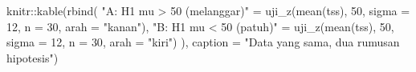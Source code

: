 \documentclass[
  indonesian,
  letterpaper,
]{book}
\newenvironment{Shaded}{\begin{snugshade}}{\end{snugshade}}
\newcommand{\AttributeTok}[1]{\textcolor[rgb]{0.40,0.45,0.13}{#1}}
\newcommand{\DecValTok}[1]{\textcolor[rgb]{0.68,0.00,0.00}{#1}}
\newcommand{\FunctionTok}[1]{\textcolor[rgb]{0.28,0.35,0.67}{#1}}
\newcommand{\NormalTok}[1]{\textcolor[rgb]{0.00,0.23,0.31}{#1}}
\newcommand{\OtherTok}[1]{\textcolor[rgb]{0.00,0.23,0.31}{#1}}
\newcommand{\SpecialCharTok}[1]{\textcolor[rgb]{0.37,0.37,0.37}{#1}}
\newcommand{\StringTok}[1]{\textcolor[rgb]{0.13,0.47,0.30}{#1}}
\begin{document}
\begin{Shaded}
\begin{Highlighting}[]
\NormalTok{knitr}\SpecialCharTok{::}\FunctionTok{kable}\NormalTok{(}\FunctionTok{rbind}\NormalTok{(}
  \StringTok{"A: H1 mu \textgreater{} 50 (melanggar)"} \OtherTok{=} \FunctionTok{uji\_z}\NormalTok{(}\FunctionTok{mean}\NormalTok{(tss), }\DecValTok{50}\NormalTok{, }\AttributeTok{sigma =} \DecValTok{12}\NormalTok{, }\AttributeTok{n =} \DecValTok{30}\NormalTok{,}
                                      \AttributeTok{arah =} \StringTok{"kanan"}\NormalTok{),}
  \StringTok{"B: H1 mu \textless{} 50 (patuh)"}     \OtherTok{=} \FunctionTok{uji\_z}\NormalTok{(}\FunctionTok{mean}\NormalTok{(tss), }\DecValTok{50}\NormalTok{, }\AttributeTok{sigma =} \DecValTok{12}\NormalTok{, }\AttributeTok{n =} \DecValTok{30}\NormalTok{,}
                                      \AttributeTok{arah =} \StringTok{"kiri"}\NormalTok{)}
\NormalTok{), }\AttributeTok{caption =} \StringTok{"Data yang sama, dua rumusan hipotesis"}\NormalTok{)}
\end{Highlighting}
\end{Shaded}
\end{document}
